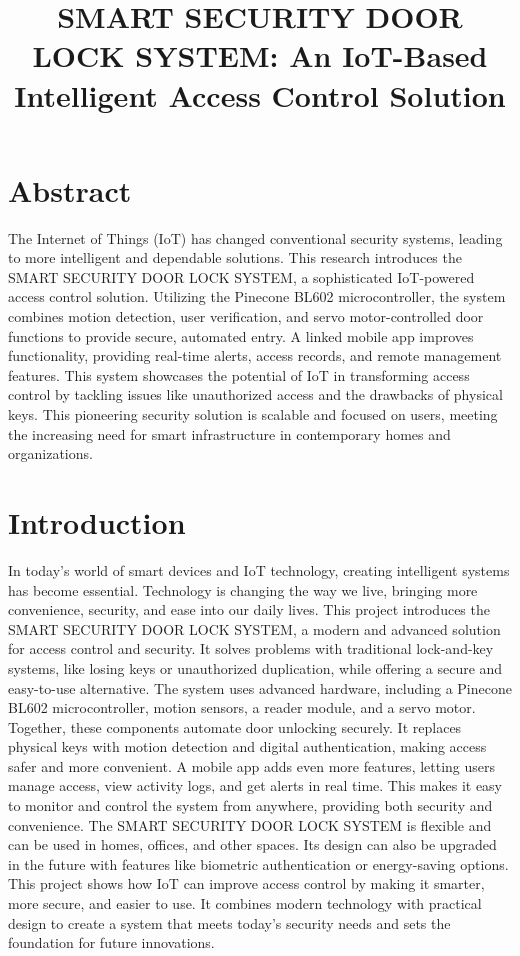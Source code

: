 \documentclass[USenglish,oneside,twocolumn]{article}
\begin{document}
	

	\title{\huge SMART SECURITY DOOR LOCK SYSTEM: An IoT-Based Intelligent Access Control Solution}


	
 \section{Abstract}
  The Internet of Things (IoT) has changed conventional security systems, leading to more intelligent and dependable solutions. This research introduces the SMART SECURITY DOOR LOCK SYSTEM, a sophisticated IoT-powered access control solution. Utilizing the Pinecone BL602 microcontroller, the system combines motion detection, user verification, and servo motor-controlled door functions to provide secure, automated entry. A linked mobile app improves functionality, providing real-time alerts, access records, and remote management features. This system showcases the potential of IoT in transforming access control by tackling issues like unauthorized access and the drawbacks of physical keys. This pioneering security solution is scalable and focused on users, meeting the increasing need for smart infrastructure in contemporary homes and organizations.
\maketitle
	
	\section{Introduction}
    \label{sec:intro}
    In today’s world of smart devices and IoT technology, creating intelligent systems has become essential. Technology is changing the way we live, bringing more convenience, security, and ease into our daily lives. This project introduces the SMART SECURITY DOOR LOCK SYSTEM, a modern and advanced solution for access control and security. It solves problems with traditional lock-and-key systems, like losing keys or unauthorized duplication, while offering a secure and easy-to-use alternative. The system uses advanced hardware, including a Pinecone BL602 microcontroller, motion sensors, a reader module, and a servo motor. Together, these components automate door unlocking securely. It replaces physical keys with motion detection and digital authentication, making access safer and more convenient. A mobile app adds even more features, letting users manage access, view activity logs, and get alerts in real time. This makes it easy to monitor and control the system from anywhere, providing both security and convenience. The SMART SECURITY DOOR LOCK SYSTEM is flexible and can be used in homes, offices, and other spaces. Its design can also be upgraded in the future with features like biometric authentication or energy-saving options. This project shows how IoT can improve access control by making it smarter, more secure, and easier to use. It combines modern technology with practical design to create a system that meets today’s security needs and sets the foundation for future innovations.
	
\end{document}
